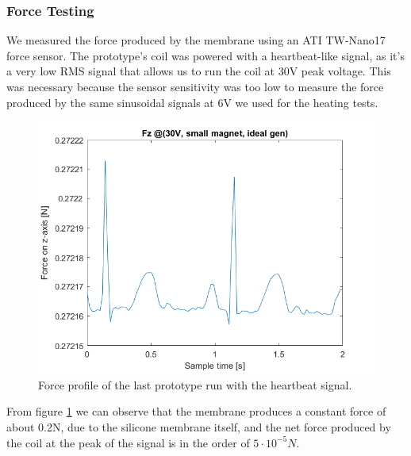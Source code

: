 \subsubsection{Force Testing}
We measured the force produced by the membrane using an ATI TW-Nano17 force sensor. The prototype's coil was powered with a heartbeat-like signal, as it's a very low RMS signal that allows us to run the coil at 30V peak voltage.
This was necessary because the sensor sensitivity was too low to measure the force produced by the same sinusoidal signals at 6V we used for the heating tests.
\begin{figure}[H]
    \centering
    \includegraphics[width = 0.5\linewidth]{Figures/Fz_@30V_small_magn_idealgen.png}
    \caption{Force profile of the last prototype run with the heartbeat signal.}
    \label{fig: Force_profile}
\end{figure}
From figure \ref{fig: Force_profile} we can observe that the membrane produces a constant force of about 0.2N, due to the silicone membrane itself, and the net force produced by the coil at the peak of the signal is in the order of $5\cdot10^{-5}N$.